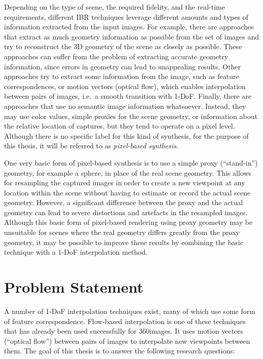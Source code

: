 Depending on the type of scene, the required fidelity, and the real-time requirements, different IBR techniques leverage different amounts and types of information extracted from the input images.
For example, there are approaches that extract as much geometry information as possible from the set of images and try to reconstruct the 3D geometry of the scene as closely as possible. These approaches can suffer from the problem of extracting accurate geometry information, since errors in geometry can lead to unappealing results.
Other approaches try to extract some information from the image, such as feature correspondences, or motion vectors (optical flow), which enables interpolation between pairs of images, i.e.\ a smooth transition with 1-DoF.
Finally, there are approaches that use no semantic image information whatsoever. Instead, they may use color values, simple proxies for the scene geometry, or information about the relative location of captures, but they tend to operate on a pixel level. Although there is no specific label for this kind of synthesis, for the purpose of this thesis, it will be referred to as \emph{pixel-based synthesis}.

One very basic form of pixel-based synthesis is to use a simple proxy (``stand-in'') geometry, for example a sphere, in place of the real scene geometry\footnotemark. This allows for resampling the captured images in order to create a new viewpoint at any location within the scene without having to estimate or record the actual scene geometry. However, a significant difference between the proxy and the actual geometry can lead to severe distortions and artefacts in the resampled images. Although this basic form of pixel-based rendering using proxy geometry may be unsuitable for scenes where the real geometry differs greatly from the proxy geometry, it may be possible to improve these results by combining the basic technique with a 1-DoF interpolation method.


\section*{Problem Statement}
A number of 1-DoF interpolation techniques exist, many of which use some form of feature correspondence. Flow-based interpolation is one of these techniques that has already been used successfully for 360\degree images. It uses motion vectors (``optical flow'') between pairs of images to interpolate new viewpoints between them. The goal of this thesis is to answer the following research questions:

